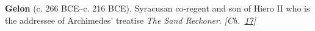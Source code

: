 \textbf{Gelon} (c. 266 BCE–c. 216 BCE). Syracusan co-regent and son of Hiero II who is the addressee of Archimedes' treatise \emph{The Sand Reckoner}. \emph{[Ch.~\hyperref[ch:bignumbers]{17}]}

